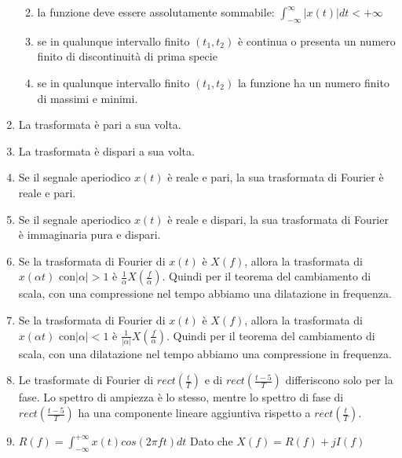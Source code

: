 \documentclass[12pt
]{article}
\providecommand{\tightlist}{%
  \setlength{\itemsep}{0pt}\setlength{\parskip}{0pt}}
\begin{document}
\begin{enumerate}
	\begin{enumerate}
		\def\labelenumii{(\alph{enumii})}
		\tightlist
		\item
		la funzione deve essere assolutamente sommabile: $\displaystyle \int_{-\infty}^{\infty} |x(t)| dt < +\infty$
		\item
		se in qualunque intervallo finito $(t_1, t_2)$ è continua o presenta un numero finito di discontinuità di prima specie
		\item
		 se in qualunque intervallo finito $(t_1, t_2)$ la funzione ha	 un numero finito di massimi e minimi.
	\end{enumerate}
	\item
	La trasformata è pari a sua volta.
	\item
	La trasformata è dispari a sua volta.
	\item
	Se il segnale aperiodico \(x(t)\) è reale e pari, la sua trasformata
	di Fourier è reale e pari.
	\item
	Se il segnale aperiodico \(x(t)\) è reale e dispari, la sua
	trasformata di Fourier è immaginaria pura e dispari.
	\item
Se la trasformata di Fourier di $x(t)$ è $X(f)$, allora la trasformata di $x(\alpha t)$ con$ |\alpha| > 1$ è $\displaystyle \frac{1}{\alpha} X(\frac{f}{\alpha})$. Quindi per il teorema del cambiamento di scala, con una compressione nel tempo abbiamo una dilatazione in frequenza.
	\item
Se la trasformata di Fourier di $x(t)$ è $X(f)$, allora la trasformata di $x(\alpha t)$ con$ |\alpha| < 1$ è $\displaystyle \frac{1}{|\alpha|} X(\frac{f}{\alpha})$. Quindi per il teorema del cambiamento di scala, con una dilatazione nel tempo abbiamo una compressione in frequenza.
	\item
	Le trasformate di Fourier di \(rect (\frac{t}{T})\) e di
	\(rect (\frac{t-5}{T})\) differiscono solo per la fase. Lo spettro di
	ampiezza è lo stesso, mentre lo spettro di fase di
	\(rect (\frac{t-5}{T})\) ha una componente lineare aggiuntiva rispetto
	a \(rect (\frac{t}{T})\).
	\item
	$\displaystyle R(f) = \int_{- \infty}^{+\infty} x(t) cos(2\pi ft)dt$
	\newline
	Dato che $\displaystyle X(f) = R(f)+ jI(f)$


\end{enumerate}
\end{document}
